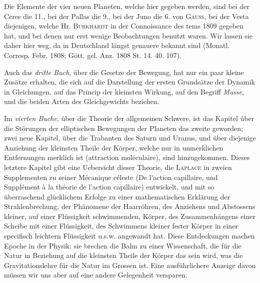 Die Elemente der vier neuen Planeten, welche hier gegeben werden, sind bei der Ceres die 11., bei der Pallas die 9., bei der Juno die 6. von \textsc{Gauss}, bei der Vesta diejenigen, welche Hr. \textsc{Burkhardt} in der Connoissance des tems 1809 gegeben hat, und bei denen nur erst wenige Beobachtungen benutzt waren. Wir lassen sie daher hier weg, da in Deutschland längst genauere bekannt sind (Monatl. Corresp. Febr. 1808; Gött. gel. Anz. 1808 St. 14. 40. 107).

Auch das \emph{dritte Buch}, über die Gesetze der Bewegung, hat nur ein paar kleine Zusätze erhalten, die sich auf die Darstellung der ersten Grundsätze der Dynamik in Gleichungen, auf das Princip der kleinsten Wirkung, auf den Begriff \emph{Masse}, und die beiden Arten des Gleichgewichts beziehen.

Im \emph{vierten Buche}, über die Theorie der allgemeinen Schwere, ist das Kapitel über die Störungen der elliptischen Bewegungen der Planeten das zweite geworden; zwei neue Kapitel, über die Trabanten des Saturn und Uranus, und über diejenige Anziehung der kleinsten Theile der Körper, welche nur in unmerklichen Entfernungen merklich ist (attraction moléculaire), sind hinzugekommen. Dieses letztere Kapitel gibt eine Uebersicht dieser Theorie, die \textsc{Laplace} in zweien Supplementen zu seiner Mécanique céleste (De l'action capillaire, und Supplément à la théorie de l'action capillaire) entwickelt, und mit so überraschend glücklichem Erfolge zu einer mathematischen Erklärung der Strahlenbrechung, der Phänomene der Haarröhren, des Anziehens und Abstossens kleiner, auf einer Flüssigkeit schwimmenden, Körper, des Zusammenhängens einer Scheibe mit einer Flüssigkeit, des Schwimmens kleiner fester Körper in einer specifisch leichtern Flüssigkeit u.s.w. angewandt hat. Diese Entdeckungen machen Epoche in der Physik: sie brechen die Bahn zu einer Wissenschaft, die für die Natur in Beziehung auf die kleinsten Theile der Körper das sein wird, was die Gravitationslehre für die Natur im Grossen ist. Eine ausführlichere Anzeige davon müssen wir uns aber auf eine andere Gelegenheit versparen.


